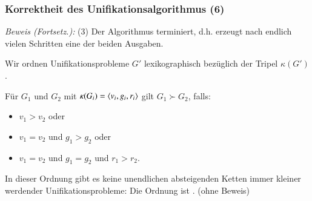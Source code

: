 \documentclass[aspectratio=1610,onlymath]{beamer}
\begin{document}
\begin{frame}[t]\frametitle{Korrektheit des Unifikationsalgorithmus (6)}


\emph{Beweis (Fortsetz.):} (3) Der Algorithmus terminiert, d.h. erzeugt nach endlich vielen Schritten eine der beiden Ausgaben.
\smallskip

Wir ordnen Unifikationsprobleme $G'$ \alert{lexikographisch} bezüglich der Tripel $\kappa(G')$.\smallskip

Für $G_1$ und $G_2$ mit $\kappa(G_i)=\langle{v_i,g_i,r_i}\rangle$ gilt $G_1\succ G_2$, falls:
\begin{itemize}
\item $v_1>v_2$ oder
\item $v_1=v_2$ und $g_1>g_2$ oder
\item $v_1=v_2$ und $g_1=g_2$ und $r_1>r_2$.
\end{itemize}\pause

\pause

In dieser Ordnung gibt es keine unendlichen absteigenden Ketten immer kleiner werdender Unifikationsprobleme: Die Ordnung ist . (ohne Beweis)

\end{frame}
\end{document}
